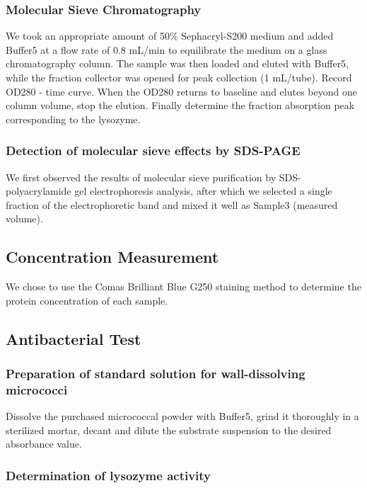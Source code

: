 \subsubsection{Molecular Sieve Chromatography}

We took an appropriate amount of 50\% Sephacryl-S200 medium and added
Buffer5 at a flow rate of 0.8 mL/min to equilibrate the medium on a
glass chromatography column. The sample was then loaded and eluted with
Buffer5, while the fraction collector was opened for peak collection (1
mL/tube). Record OD280 - time curve. When the OD280 returns to baseline
and elutes beyond one column volume, stop the elution. Finally determine
the fraction absorption peak corresponding to the lysozyme.

\subsubsection{Detection of molecular sieve effects by SDS-PAGE}

We first observed the results of molecular sieve purification by
SDS-polyacrylamide gel electrophoresis analysis, after which we selected
a single fraction of the electrophoretic band and mixed it well as
Sample3 (measured volume).

\hypertarget{concentration-measurement}{%
	\subsection{Concentration Measurement}\label{concentration-measurement}}

We chose to use the Comas Brilliant Blue G250 staining method to
determine the protein concentration of each sample.

\hypertarget{antibacterial-test}{%
	\subsection{Antibacterial Test}\label{antibacterial-test}}

\subsubsection{Preparation of standard solution for wall-dissolving
	micrococci }

Dissolve the purchased micrococcal powder with Buffer5, grind it
thoroughly in a sterilized mortar, decant and dilute the substrate
suspension to the desired absorbance value.

\subsubsection{Determination of lysozyme activity}

